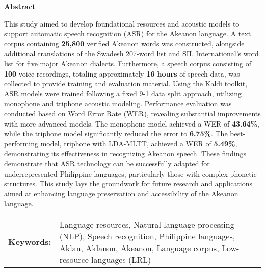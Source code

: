 \begin{center}
\textbf{Abstract}
\end{center}
\setlength{\parindent}{0pt}
This study aimed to develop foundational resources and acoustic models to support automatic speech recognition (ASR) for the Akeanon language. A text corpus containing \textbf{25,800} verified Akeanon words was constructed, alongside additional translations of the Swadesh 207-word list and SIL International's word list for five major Akeanon dialects. Furthermore, a speech corpus consisting of \textbf{100} voice recordings, totaling approximately \textbf{16 hours} of speech data, was collected to provide training and evaluation material. Using the Kaldi toolkit, ASR models were trained following a fixed 9-1 data split approach, utilizing monophone and triphone acoustic modeling. Performance evaluation was conducted based on Word Error Rate (WER), revealing substantial improvements with more advanced models. The monophone model achieved a WER of \textbf{43.64\%}, while the triphone model significantly reduced the error to \textbf{6.75\%}. The best-performing model, triphone with LDA-MLTT, achieved a WER of \textbf{5.49\%}, demonstrating its effectiveness in recognizing Akeanon speech. These findings demonstrate that ASR technology can be successfully adapted for underrepresented Philippine languages, particularly those with complex phonetic structures. This study lays the groundwork for future research and applications aimed at enhancing language preservation and accessibility of the Akeanon language.


\begin{tabular}{lp{4.25in}}
\hspace{-0.5em}\textbf{Keywords:}\hspace{0.25em} & Language resources, Natural language processing (NLP), Speech recognition, Philippine languages, Aklan, Aklanon, Akeanon, Language corpus, Low-resource languages (LRL)\\
\end{tabular}
